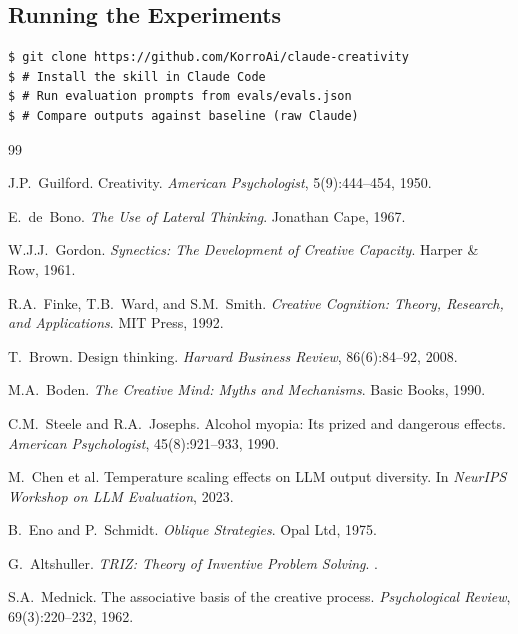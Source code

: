 \documentclass[11pt,a4paper]{article}
\begin{document}
\subsection*{Running the Experiments}
\begin{verbatim}
$ git clone https://github.com/KorroAi/claude-creativity
$ # Install the skill in Claude Code
$ # Run evaluation prompts from evals/evals.json
$ # Compare outputs against baseline (raw Claude)
\end{verbatim}


\begin{thebibliography}{99}

J.P.~Guilford.
\newblock Creativity.
\newblock \textit{American Psychologist}, 5(9):444--454, 1950.

E.~de~Bono.
\newblock \textit{The Use of Lateral Thinking}.
\newblock Jonathan Cape, 1967.

W.J.J.~Gordon.
\newblock \textit{Synectics: The Development of Creative Capacity}.
\newblock Harper \& Row, 1961.

R.A.~Finke, T.B.~Ward, and S.M.~Smith.
\newblock \textit{Creative Cognition: Theory, Research, and Applications}.
\newblock MIT Press, 1992.

T.~Brown.
\newblock Design thinking.
\newblock \textit{Harvard Business Review}, 86(6):84--92, 2008.

M.A.~Boden.
\newblock \textit{The Creative Mind: Myths and Mechanisms}.
\newblock Basic Books, 1990.

C.M.~Steele and R.A.~Josephs.
\newblock Alcohol myopia: Its prized and dangerous effects.
\newblock \textit{American Psychologist}, 45(8):921--933, 1990.

M.~Chen et al.
\newblock Temperature scaling effects on LLM output diversity.
\newblock In \textit{NeurIPS Workshop on LLM Evaluation}, 2023.

B.~Eno and P.~Schmidt.
\newblock \textit{Oblique Strategies}.
\newblock Opal Ltd, 1975.

G.~Altshuller.
\newblock \textit{TRIZ: Theory of Inventive Problem Solving}.
.

S.A.~Mednick.
\newblock The associative basis of the creative process.
\newblock \textit{Psychological Review}, 69(3):220--232, 1962.


\end{thebibliography}
\end{document}
